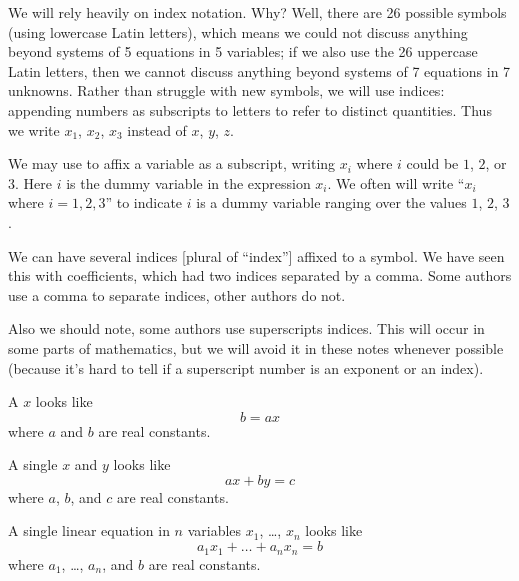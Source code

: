 We will rely heavily on index notation. Why? Well, there are 26 possible
symbols (using lowercase Latin letters), which means we could not
discuss anything beyond systems of 5 equations in 5 variables; if we
also use the 26 uppercase Latin letters, then we cannot discuss anything
beyond systems of 7 equations in 7 unknowns. Rather than struggle with
new symbols, we will use indices: appending numbers as subscripts to
letters to refer to distinct quantities. Thus we write $x_{1}$, $x_{2}$,
$x_{3}$ instead of $x$, $y$, $z$.

We may use  to affix a variable as a subscript,
writing $x_{i}$ where $i$ could be $1$, $2$, or $3$. Here $i$ is the
dummy variable in the expression $x_{i}$. We often will write ``$x_{i}$
where $i=1,2,3$'' to indicate $i$ is a dummy variable ranging over the
values $1$, $2$, $3$.

We can have several indices [plural of ``index''] affixed to a
symbol. We have seen this with coefficients, which had two indices
separated by a comma. Some authors use a comma to separate indices,
other authors do not.

Also we should note, some authors use superscripts indices. This will
occur in some parts of mathematics, but we will avoid it in these notes
whenever possible (because it's hard to tell if a superscript number is an
exponent or an index).

A  $x$ looks like
\begin{equation}
b = ax
\end{equation}
where $a$ and $b$ are real constants.

A single  $x$ and $y$ looks like
\begin{equation}
  ax + by = c
\end{equation}
where $a$, $b$, and $c$ are real constants.

A single linear equation in $n$ variables $x_{1}$, \dots, $x_{n}$ looks
like
\begin{equation}
a_{1}x_{1} + \dots + a_{n}x_{n} = b
\end{equation}
where $a_{1}$, \dots, $a_{n}$, and $b$ are real constants.


